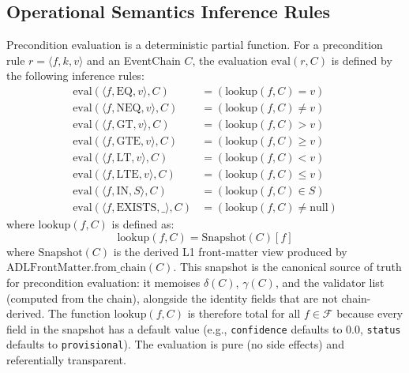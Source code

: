 \subsection{Operational Semantics Inference Rules}

Precondition evaluation is a deterministic partial function. For a precondition rule $r = \langle f, k, v \rangle$ and an EventChain $C$, the evaluation $\text{eval}(r, C)$ is defined by the following inference rules:
\begin{align}
    \text{eval}(\langle f, \text{EQ}, v \rangle, C) &= (\text{lookup}(f, C) = v) \\
    \text{eval}(\langle f, \text{NEQ}, v \rangle, C) &= (\text{lookup}(f, C) \neq v) \\
    \text{eval}(\langle f, \text{GT}, v \rangle, C) &= (\text{lookup}(f, C) > v) \\
    \text{eval}(\langle f, \text{GTE}, v \rangle, C) &= (\text{lookup}(f, C) \geq v) \\
    \text{eval}(\langle f, \text{LT}, v \rangle, C) &= (\text{lookup}(f, C) < v) \\
    \text{eval}(\langle f, \text{LTE}, v \rangle, C) &= (\text{lookup}(f, C) \leq v) \\
    \text{eval}(\langle f, \text{IN}, S \rangle, C) &= (\text{lookup}(f, C) \in S) \\
    \text{eval}(\langle f, \text{EXISTS}, \_ \rangle, C) &= (\text{lookup}(f, C) \neq \text{null})
\end{align}
where $\text{lookup}(f, C)$ is defined as:
\begin{equation}
    \text{lookup}(f, C) = \text{Snapshot}(C)[f]
\end{equation}
where $\text{Snapshot}(C)$ is the derived L1 front-matter view produced by $\text{ADLFrontMatter.}\text{from\_chain}(C)$. This snapshot is the canonical source of truth for precondition evaluation: it memoises $\delta(C)$, $\gamma(C)$, and the validator list (computed from the chain), alongside the identity fields that are not chain-derived. The function $\text{lookup}(f, C)$ is therefore total for all $f \in \mathcal{F}$ because every field in the snapshot has a default value (e.g., \texttt{confidence} defaults to 0.0, \texttt{status} defaults to \texttt{provisional}). The evaluation is pure (no side effects) and referentially transparent.
